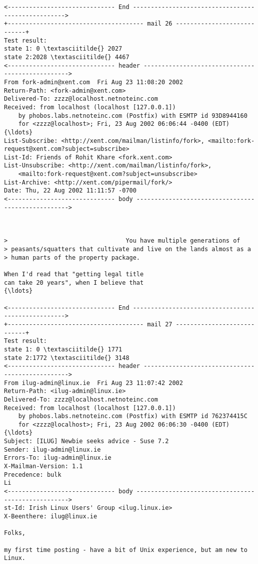 \documentclass[11pt]{article}
\begin{document}
\begin{Verbatim}[commandchars=\\\{\}]
<------------------------------ End --------------------------------------------------->
+-------------------------------------- mail 26 ----------------------------+
Test result:
state 1: 0 \textasciitilde{} 2027
state 2:2028 \textasciitilde{} 4467
<------------------------------ header ------------------------------------------------->
From fork-admin@xent.com  Fri Aug 23 11:08:20 2002
Return-Path: <fork-admin@xent.com>
Delivered-To: zzzz@localhost.netnoteinc.com
Received: from localhost (localhost [127.0.0.1])
	by phobos.labs.netnoteinc.com (Postfix) with ESMTP id 93D8944160
	for <zzzz@localhost>; Fri, 23 Aug 2002 06:06:44 -0400 (EDT)
{\ldots}
List-Subscribe: <http://xent.com/mailman/listinfo/fork>, <mailto:fork-request@xent.com?subject=subscribe>
List-Id: Friends of Rohit Khare <fork.xent.com>
List-Unsubscribe: <http://xent.com/mailman/listinfo/fork>,
    <mailto:fork-request@xent.com?subject=unsubscribe>
List-Archive: <http://xent.com/pipermail/fork/>
Date: Thu, 22 Aug 2002 11:11:57 -0700
<------------------------------ body --------------------------------------------------->



>                                 You have multiple generations of
> peasants/squatters that cultivate and live on the lands almost as a
> human parts of the property package.

When I'd read that "getting legal title
can take 20 years", when I believe that
{\ldots}

<------------------------------ End --------------------------------------------------->
+-------------------------------------- mail 27 ----------------------------+
Test result:
state 1: 0 \textasciitilde{} 1771
state 2:1772 \textasciitilde{} 3148
<------------------------------ header ------------------------------------------------->
From ilug-admin@linux.ie  Fri Aug 23 11:07:42 2002
Return-Path: <ilug-admin@linux.ie>
Delivered-To: zzzz@localhost.netnoteinc.com
Received: from localhost (localhost [127.0.0.1])
	by phobos.labs.netnoteinc.com (Postfix) with ESMTP id 762374415C
	for <zzzz@localhost>; Fri, 23 Aug 2002 06:06:30 -0400 (EDT)
{\ldots}
Subject: [ILUG] Newbie seeks advice - Suse 7.2
Sender: ilug-admin@linux.ie
Errors-To: ilug-admin@linux.ie
X-Mailman-Version: 1.1
Precedence: bulk
Li
<------------------------------ body --------------------------------------------------->
st-Id: Irish Linux Users' Group <ilug.linux.ie>
X-Beenthere: ilug@linux.ie

Folks,
 
my first time posting - have a bit of Unix experience, but am new to Linux.


\end{Verbatim}
\end{document}
